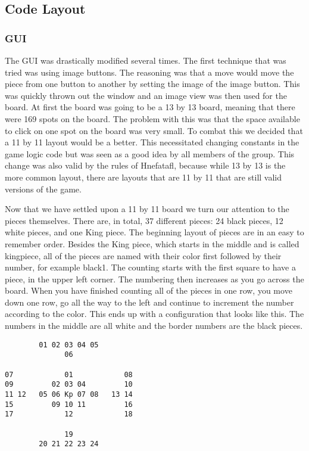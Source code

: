 \documentclass{article}
\begin{document}
\subsection{Code Layout}

\subsubsection{GUI}
	The GUI was drastically modified several times. The first technique that was tried was using image buttons. The reasoning was that a move would move the piece from one button to another by setting the image of the image button. This was quickly thrown out the window and an image view was then used for the board. At first the board was going to be a 13 by 13 board, meaning that there were 169 spots on the board. The problem with this was that the space available to click on one spot on the board was very small. To combat this we decided that a 11 by 11 layout would be a better. This necessitated changing constants in the game logic code but was seen as a good idea by all members of the group. This change was also valid by the rules of Hnefatafl, because while 13 by 13 is the more common layout, there are layouts that are 11 by 11 that are still valid versions of the game. \par
	Now that we have settled upon a 11 by 11 board we turn our attention to the pieces themselves. There are, in total, 37 different pieces: 24 black pieces, 12 white pieces, and one King piece. The beginning layout of pieces are in an easy to remember order. Besides the King piece, which starts in the middle and is called kingpiece, all of the pieces are named with their color first followed by their number, for example black1. The counting starts with the first square to have a piece, in the upper left corner. The numbering then increases as you go across the board. When you have finished counting all of the pieces in one row, you move down one row, go all the way to the left and continue to increment the number according to the color. This ends up with a configuration that looks like this. The numbers in the middle are all white and the border numbers are the black pieces.
\begin{verbatim}
        01 02 03 04 05
              06
      
07            01            08
09         02 03 04         10
11 12   05 06 Kp 07 08   13 14
15         09 10 11         16
17            12            18

              19
        20 21 22 23 24
\end{verbatim}
\end{document}
